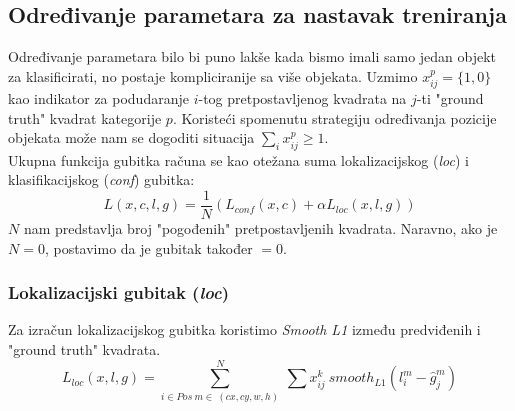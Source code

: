 \subsection{Određivanje parametara za nastavak treniranja}
Određivanje parametara bilo bi puno lakše kada bismo imali samo jedan objekt za klasificirati, no postaje kompliciranije sa više objekata.
Uzmimo $x^p_{ij}=\{1,0\}$ kao indikator za podudaranje $i$-tog pretpostavljenog kvadrata na $j$-ti "ground truth" kvadrat kategorije $p$.
Koristeći spomenutu strategiju određivanja pozicije objekata može nam se dogoditi situacija $\sum_i{x_{ij}^p} \geq 1$. \\
Ukupna funkcija gubitka računa se kao otežana suma lokalizacijskog (\emph{loc}) i klasifikacijskog (\emph{conf}) gubitka:
$$L(x,c,l,g)=\frac{1}{N}(L_{conf}(x,c)+\alpha L_{loc}(x,l,g))$$
$N$ nam predstavlja broj "pogođenih" pretpostavljenih kvadrata. Naravno, ako je $N=0$, postavimo da je gubitak također $=0$.
\subsubsection{Lokalizacijski gubitak (\emph{loc})}
Za izračun lokalizacijskog gubitka koristimo \emph{Smooth L1} između predviđenih i "ground truth" kvadrata.
$$L_{loc}(x,l,g)=\sum_{i\in Pos\ m \in\ (cx, cy, w, h)}^{N} \ \sum x_{ij}^k\ smooth_{L1}(l_i^m - \hat g_j^m)$$
